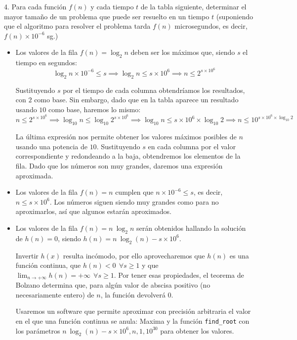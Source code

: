\begin{ejercicio}
{4. Para cada función $f(n)$ y cada tiempo $t$ de la tabla siguiente, determinar el mayor tamaño de un problema que puede ser resuelto en un tiempo $t$ (suponiendo que el algoritmo para resolver el problema tarda $f(n)$ microsegundos, es decir, $f(n) \times 10^{-6}$ sg.)}

\begin{itemize}
\item Los valores de la fila $f(n) = \log_2 n$ deben ser los máximos que, siendo $s$ el tiempo en segundos:
$$
\log_2 n \times 10^{-6} \le s \implies \log_2 n \le s \times 10^6 \implies n \le 2^{s \times 10^6}
$$

Sustituyendo $s$ por el tiempo de cada columna obtendríamos los resultados, con $2$ como base. Sin embargo, dado que en la tabla aparece un resultado usando $10$ como base, haremos lo mismo:
$$
n \le 2^{s \times 10^6} \implies \log_{10} n \le \log_{10} 2^{s \times 10^6} \implies \log_{10} n \le {s \times 10^6} \times \log_{10} 2 \implies n \le 10^{{s \times 10^6} \times \log_{10} 2}
$$

La última expresión nos permite obtener los valores máximos posibles de $n$ usando una potencia de $10$. Sustituyendo $s$ en cada columna por el valor correspondiente y redondeando a la baja, obtendremos los elementos de la fila. Dado que los números son muy grandes, daremos una expresión aproximada.

\item Los valores de la fila $f(n) = n$ cumplen que $
n \times 10^{-6} \le s$, es decir, $n \le s \times 10^6$. Los números siguen siendo muy grandes como para no aproximarlos, así que algunos estarán aproximados.

\item Los valores de la fila $f(n) = n\ \log_2 n$ serán obtenidos hallando la solución de $h(n) = 0$, siendo $h(n) = n\ \log_2(n) - s \times 10^6$.

Invertir $h(x)$ resulta incómodo, por ello aprovecharemos que $h(n)$ es una función continua, que $h(n) < 0 \ \ \forall s \ge 1$ y que $\displaystyle \lim_{n \to +\infty} h(n) = +\infty \ \ \forall s \ge 1$. Por tener esas propiedades, el teorema de Bolzano determina que, para algún valor de abscisa positivo (no necesariamente entero) de $n$, la función devolverá $0$.

Usaremos un software que permite aproximar con precisión arbitraria el valor en el que una función continua se anula: Maxima y la función \texttt{find\_root} con los parámetros $n\ \log_2(n) - s \times 10^6, n, 1, 10^{30}$ para obtener los valores.


\end{itemize}
\end{ejercicio}
